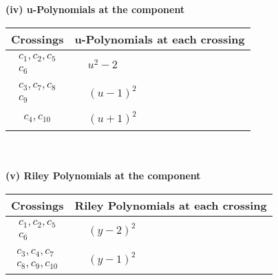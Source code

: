 \documentclass[1p]{elsarticle_modified}
\theoremstyle{definition}
\begin{document}
\newpage\renewcommand{\arraystretch}{1}
\flushleft \textbf{(iv) u-Polynomials at the component}\newline \\
\begin{tabular}{m{50pt}|m{274pt}}
Crossings & \hspace{64pt}u-Polynomials at each crossing \\
\hline $$\begin{aligned}c_{1},c_{2},c_{5}\\c_{6}\end{aligned}$$&$\begin{aligned}
&u^2-2
\end{aligned}$\\
\hline $$\begin{aligned}c_{3},c_{7},c_{8}\\c_{9}\end{aligned}$$&$\begin{aligned}
&(u-1)^2
\end{aligned}$\\
\hline $$\begin{aligned}c_{4},c_{10}\end{aligned}$$&$\begin{aligned}
&(u+1)^2
\end{aligned}$\\
\hline
\end{tabular}\\~\\
\newpage\renewcommand{\arraystretch}{1}
\flushleft \textbf{(v) Riley Polynomials at the component}\newline \\
\begin{tabular}{m{50pt}|m{274pt}}
Crossings & \hspace{64pt}Riley Polynomials at each crossing \\
\hline $$\begin{aligned}c_{1},c_{2},c_{5}\\c_{6}\end{aligned}$$&$\begin{aligned}
&(y-2)^2
\end{aligned}$\\
\hline $$\begin{aligned}c_{3},c_{4},c_{7}\\c_{8},c_{9},c_{10}\end{aligned}$$&$\begin{aligned}
&(y-1)^2
\end{aligned}$\\
\hline
\end{tabular}\\~\\
\end{document}
